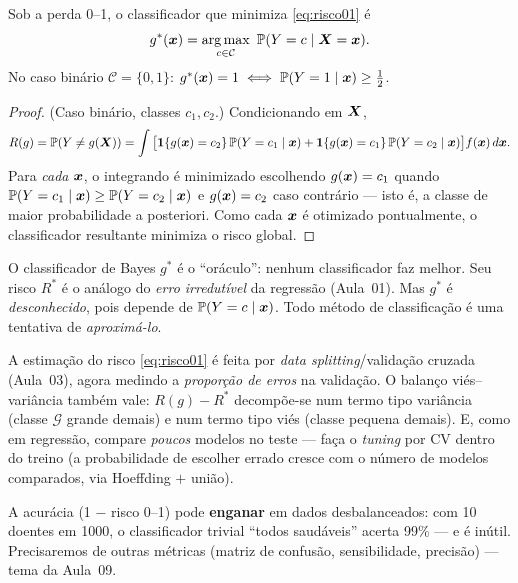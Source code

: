 \documentclass[11pt,a4paper]{article}
\begin{document}
\begin{teorema}\label{teo:bayes}
Sob a perda 0--1, o classificador que minimiza \eqref{eq:risco01} é
\[
  g^*(\x) = \argmax_{c\in\mathcal{C}}\ \Prob(Y=c\mid \X=\x).
\]
No caso binário $\mathcal{C}=\{0,1\}$: $g^*(\bm{x})=1 \iff \mathbb{P}(Y=1\mid\bm{x})\ge \tfrac12$.
\end{teorema}
\begin{proof}
(Caso binário, classes $c_1,c_2$.) Condicionando em $\bm{X}$,
\[
  R(g)=\mathbb{P}(Y\ne g(\bm{X}))
  =\int \big[\mathbf{1}\!\left\{g(\bm{x})=c_2\right\}\mathbb{P}(Y=c_1\mid\bm{x})+\mathbf{1}\!\left\{g(\bm{x})=c_1\right\}\mathbb{P}(Y=c_2\mid\bm{x})\big]f(\bm{x})\,d\bm{x}.
\]
Para \emph{cada} $\bm{x}$, o integrando é minimizado escolhendo $g(\bm{x})=c_1$ quando
$\mathbb{P}(Y=c_1\mid\bm{x})\ge\mathbb{P}(Y=c_2\mid\bm{x})$ e $g(\bm{x})=c_2$ caso contrário --- isto é,
a classe de maior probabilidade a posteriori. Como cada $\bm{x}$ é otimizado
pontualmente, o classificador resultante minimiza o risco global.
\end{proof}

\begin{ideia}
O classificador de Bayes $g^*$ é o ``oráculo'': nenhum classificador faz melhor. Seu
risco $R^*$ é o análogo do \emph{erro irredutível} da regressão (Aula~01). Mas
$g^*$ é \emph{desconhecido}, pois depende de $\mathbb{P}(Y=c\mid\bm{x})$. Todo método de
classificação é uma tentativa de \emph{aproximá-lo}.
\end{ideia}

\begin{observacao}
A estimação do risco \eqref{eq:risco01} é feita por \emph{data splitting}/validação
cruzada (Aula~03), agora medindo a \emph{proporção de erros} na validação. O balanço
viés--variância também vale: $R(g)-R^*$ decompõe-se num termo tipo variância (classe
$\mathcal{G}$ grande demais) e num termo tipo viés (classe pequena demais). E, como
em regressão, compare \emph{poucos} modelos no teste --- faça o \emph{tuning} por CV
dentro do treino (a probabilidade de escolher errado cresce com o número de modelos
comparados, via Hoeffding $+$ união).
\end{observacao}

\begin{atencao}
A acurácia (1 $-$ risco 0--1) pode \textbf{enganar} em dados desbalanceados: com 10
doentes em 1000, o classificador trivial ``todos saudáveis'' acerta 99\% --- e é
inútil. Precisaremos de outras métricas (matriz de confusão, sensibilidade,
precisão) --- tema da Aula~09.
\end{atencao}
\end{document}
